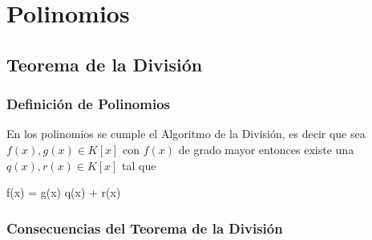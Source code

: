 \documentclass[12pt, fleqn]{report}                             %
\newenvironment{MultiLineEquation*}[1]                          %
        {\begin{equation*}\begin{alignedat}{#1}}                    %
        {\end{alignedat}\end{equation*}}                            %
\begin{document}
\chapter{Polinomios}
    \clearpage

    \section{Teorema de la División}


        \subsection{Definición de Polinomios}

            En los polinomios se cumple el Algoritmo de la División, es decir
            que sea $f(x), g(x) \in K[x]$ con $f(x)$ de grado mayor entonces
            existe una $q(x), r(x) \in K[x]$ tal que
            \begin{MultiLineEquation*}{3}
               f(x) = g(x) \; q(x) + r(x)  
            \end{MultiLineEquation*}


        \subsection{Consecuencias del Teorema de la División}
\end{document}
